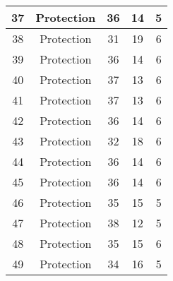 \documentclass[results.tex]{subfiles}
\begin{document}
\begin{center}
\begin{tabular}{| c || c | c | c | c |}
            \hline
            37                      & Protection                   & 36                     & 14                      & 5                    \\
            \hline
            38                      & Protection                   & 31                     & 19                      & 6                    \\
            \hline
            39                      & Protection                   & 36                     & 14                      & 6                    \\
            \hline
            40                      & Protection                   & 37                     & 13                      & 6                    \\
            \hline
            41                      & Protection                   & 37                     & 13                      & 6                    \\
            \hline
            42                      & Protection                   & 36                     & 14                      & 6                    \\
            \hline
            43                      & Protection                   & 32                     & 18                      & 6                    \\
            \hline
            44                      & Protection                   & 36                     & 14                      & 6                    \\
            \hline
            45                      & Protection                   & 36                     & 14                      & 6                    \\
            \hline
            46                      & Protection                   & 35                     & 15                      & 5                    \\
            \hline
            47                      & Protection                   & 38                     & 12                      & 5                    \\
            \hline
            48                      & Protection                   & 35                     & 15                      & 6                    \\
            \hline
            49                      & Protection                   & 34                     & 16                      & 5                    \\
            \hline
        \end{tabular}
    \end{center}
\end{document}
